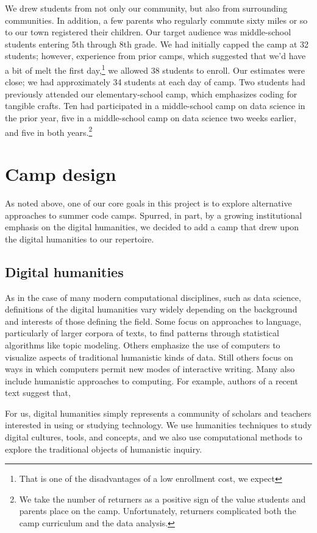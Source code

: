 We drew students from not only our community, but also from
surrounding communities.  In addition, a few parents who regularly
commute sixty miles or so to our town registered their children.  Our
target audience was middle-school students entering 5th through 8th grade.
We had initially capped the camp at 32 students; however, experience
from prior camps, which suggested that we'd have a bit of melt the
first day,\footnote{That is one of the disadvantages of a low enrollment cost, we
expect} we allowed 38 students to enroll.  Our estimates were close;
we had approximately 34 students at each day of camp.  Two students
had previously attended our elementary-school camp, which emphasizes
coding for tangible crafts.  Ten had participated in a middle-school
camp on data science in the prior year, five in
a middle-school camp on data science two weeks earlier, and five
in both years.\footnote{We take the number of returners
as a positive sign of the value students and parents place on the camp.
Unfortunately, returners complicated both the camp curriculum and the
data analysis.}  

\section{Camp design}

As noted above, one of our core goals in this project is to explore
alternative approaches to summer code camps.  Spurred, in part, by
a growing institutional emphasis on the digital humanities, we
decided to add a camp that drew upon the digital humanities to our
repertoire.

\subsection{Digital humanities}

As in the case of many modern computational disciplines, such as
data science, definitions of the digital humanities vary widely
depending on the background and interests of those defining the
field.  Some focus on approaches to language, particularly of larger
corpora of texts, to find patterns through statistical algorithms
like topic modeling.  Others emphasize the use of computers to
visualize aspects of traditional humanistic kinds of data.  Still
others focus on ways in which computers permit new modes of interactive
writing.  Many also include humanistic approaches to computing.
For example, authors of a recent text suggest that,
\begin{blockquote}
For us, digital humanities simply represents a community of scholars and teachers interested in using or studying technology. We use humanities techniques to study digital cultures, tools, and concepts, and we also use computational methods to explore the traditional objects of humanistic inquiry. \cite{Battershill2017}
\end{blockquote}

